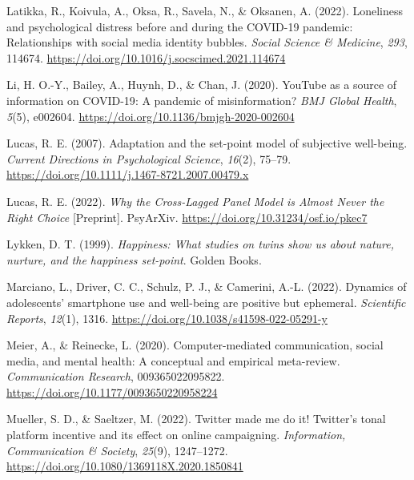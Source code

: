 \documentclass[
  man,mask,floatsintext]{apa7}
\newlength{\cslhangindent}
\newlength{\cslentryspacingunit} %
\newenvironment{CSLReferences}[2] %
 {%
  \setlength{\parindent}{0pt}
  \ifodd #1
  \let\oldpar\par
  \def\par{\hangindent=\cslhangindent\oldpar}
  \fi
  \setlength{\parskip}{#2\cslentryspacingunit}
 }%
 {}
\begin{document}
\begin{CSLReferences}{1}{0}
\leavevmode{}%
Latikka, R., Koivula, A., Oksa, R., Savela, N., \& Oksanen, A. (2022). Loneliness and psychological distress before and during the {COVID-19} pandemic: {Relationships} with social media identity bubbles. \emph{Social Science \& Medicine}, \emph{293}, 114674. \url{https://doi.org/10.1016/j.socscimed.2021.114674}

\leavevmode{}%
Li, H. O.-Y., Bailey, A., Huynh, D., \& Chan, J. (2020). {YouTube} as a source of information on {COVID-19}: A pandemic of misinformation? \emph{BMJ Global Health}, \emph{5}(5), e002604. \url{https://doi.org/10.1136/bmjgh-2020-002604}

\leavevmode{}%
Lucas, R. E. (2007). Adaptation and the set-point model of subjective well-being. \emph{Current Directions in Psychological Science}, \emph{16}(2), 75--79. \url{https://doi.org/10.1111/j.1467-8721.2007.00479.x}

\leavevmode{}%
Lucas, R. E. (2022). \emph{Why the {Cross-Lagged Panel Model} is {Almost Never} the {Right Choice}} {[}Preprint{]}. {PsyArXiv}. \url{https://doi.org/10.31234/osf.io/pkec7}

\leavevmode{}%
Lykken, D. T. (1999). \emph{Happiness: {What} studies on twins show us about nature, nurture, and the happiness set-point}. {Golden Books}.

\leavevmode{}%
Marciano, L., Driver, C. C., Schulz, P. J., \& Camerini, A.-L. (2022). Dynamics of adolescents' smartphone use and well-being are positive but ephemeral. \emph{Scientific Reports}, \emph{12}(1), 1316. \url{https://doi.org/10.1038/s41598-022-05291-y}

\leavevmode{}%
Meier, A., \& Reinecke, L. (2020). Computer-mediated communication, social media, and mental health: {A} conceptual and empirical meta-review. \emph{Communication Research}, 009365022095822. \url{https://doi.org/10.1177/0093650220958224}

\leavevmode{}%
Mueller, S. D., \& Saeltzer, M. (2022). Twitter made me do it! {Twitter}'s tonal platform incentive and its effect on online campaigning. \emph{Information, Communication \& Society}, \emph{25}(9), 1247--1272. \url{https://doi.org/10.1080/1369118X.2020.1850841}


\end{CSLReferences}
\end{document}
